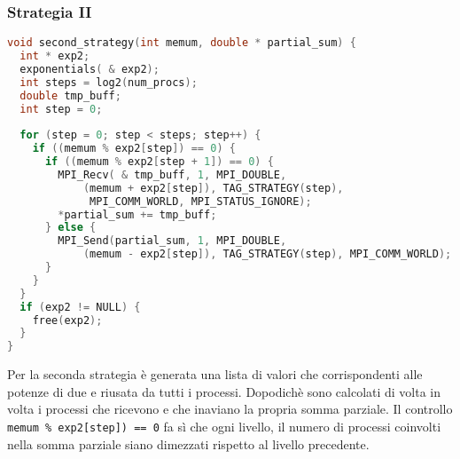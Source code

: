 \documentclass[a4paper,11pt]{book}
\begin{document}
\subsubsection{Strategia II}
\begin{lstlisting}[language=C]
void second_strategy(int memum, double * partial_sum) {
  int * exp2;
  exponentials( & exp2);
  int steps = log2(num_procs);
  double tmp_buff;
  int step = 0;
  
  for (step = 0; step < steps; step++) {
    if ((memum % exp2[step]) == 0) {
      if ((memum % exp2[step + 1]) == 0) {
        MPI_Recv( & tmp_buff, 1, MPI_DOUBLE, 
            (memum + exp2[step]), TAG_STRATEGY(step),
             MPI_COMM_WORLD, MPI_STATUS_IGNORE);
        *partial_sum += tmp_buff;
      } else {
        MPI_Send(partial_sum, 1, MPI_DOUBLE, 
            (memum - exp2[step]), TAG_STRATEGY(step), MPI_COMM_WORLD);
      }
    }
  }
  if (exp2 != NULL) {
    free(exp2);
  }
}
\end{lstlisting}
Per la seconda strategia è generata una lista di valori che corrispondenti alle potenze di due e riusata da tutti i processi. Dopodichè sono calcolati di volta in volta i processi che ricevono e che inaviano la propria somma parziale. Il controllo \verb|memum % exp2[step]) == 0| fa sì che ogni livello, il numero di processi coinvolti nella somma parziale siano dimezzati rispetto al livello precedente.
\end{document}
